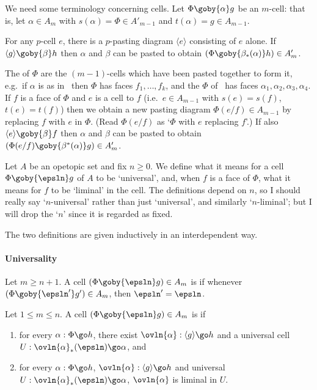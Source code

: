We need some terminology concerning cells.  Let $\Phi \goby{\alpha} g$ be an
$m$-cell: that is, let $\alpha \in A_m$ with $s(\alpha) = \Phi \in A'_{m-1}$
and $t(\alpha) = g \in A_{m-1}$.

For any $p$-cell $e$, there is a $p$-pasting diagram $\langle e \rangle$
consisting of $e$ alone.  If $\langle g \rangle \goby{\beta} h$ then
$\alpha$ and $\beta$ can be pasted to obtain $(\Phi \goby{\beta_*(\alpha)} h)
\in A'_m$.

The  of $\Phi$ are the $(m-1)$-cells which have been pasted
together to form it, e.g.\ if $\alpha$ is as in~ then $\Phi$
has faces $f_1, \ldots, f_k$, and the $\Phi$ of~ has faces
$\alpha_1, \alpha_2, \alpha_3, \alpha_4$.  If $f$ is a face of $\Phi$ and $e$
is a cell  to $f$ (i.e.\ $e\in A_{m-1}$ with $s(e)=s(f)$,
$t(e)=t(f)$) then we obtain a new pasting diagram $\Phi(e/f) \in A_{m-1}$ by
replacing $f$ with $e$ in $\Phi$.  (Read $\Phi(e/f)$ as `$\Phi$ with $e$
replacing $f$'.)  If also $\langle e \rangle \goby{\beta} f$ then $\alpha$
and $\beta$ can be pasted to obtain $(\Phi(e/f) \goby{\beta^*(\alpha)} g) \in
A'_m$.



Let $A$ be an opetopic set and fix $n\geq 0$.  We define what it means for a
cell $\Phi \goby{\epsln} g$ of $A$ to be `universal', and, when $f$ is a face
of $\Phi$, what it means for $f$ to be `liminal' in the cell.  The
definitions depend on $n$, so I should really say `$n$-universal' rather than
just `universal', and similarly `$n$-liminal'; but I will drop the `$n$'
since it is regarded as fixed.  

The two definitions are given inductively in an interdependent way.

\paragraph{Universality} 

Let $m\geq n+1$.  A cell $(\Phi \goby{\epsln} g) \in A_m$ is
 if whenever $(\Phi \goby{\epsln'} g')\in A_m$, then
$\epsln'=\epsln$.

Let $1\leq m\leq n$.  A cell $(\Phi \goby{\epsln} g) \in A_m$ is
 if
%
\begin{enumerate}
\item 	\label{part:univ-univ}
for every $\alpha: \Phi \go h$, there exist $\ovln{\alpha}: \langle
g\rangle \go h$ and a universal cell $U: \ovln{\alpha}_*(\epsln) \go \alpha$,
and 
\item 	\label{part:univ-liminal}
for every $\alpha: \Phi \go h$, $\ovln{\alpha}: \langle g\rangle \go h$
and universal $U: \ovln{\alpha}_*(\epsln) \go \alpha$, $\ovln{\alpha}$ is
liminal in $U$.
\end{enumerate}

